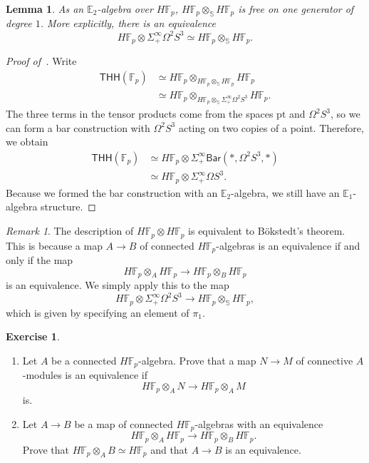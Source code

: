 \documentclass[10pt, oneside]{memoir}
\newtheorem{lem}[thm]{Lemma}
\theoremstyle{definition}
\newtheorem{exer}[thm]{Exercise}
\theoremstyle{remark}
\newtheorem{rmk}[thm]{Remark}
\theoremstyle{plain}
\theoremstyle{definition}
\theoremstyle{remark}
\newcommand{\E}{\mathbb{E}}
\newcommand{\F}{\mathbb{F}}
\newcommand{\bS}{\mathbb{S}}
\newcommand{\mr}[1]{\mathrm{#1}}
\newcommand{\ms}[1]{\mathsf{#1}}
\newcommand{\1}{\mathbf{1}}
\newcommand{\2}{\mathbf{2}}
\newcommand{\3}{\mathbf{3}}
\newcommand{\THH}{\ms{THH}}
\begin{document}
\begin{lem}\label{lem:tensorproduct}
    As an \(\E_2 \)-algebra over \(H \F_p \), \(H \F_p \otimes_{\bS} H \F_p \) is free on one generator of degree \(1 \). More explicitly, there is an equivalence
    \[ H \F_p \otimes \Sigma_+^{\infty} \Omega^2 S^3 \simeq H \F_p \otimes_{\bS} H \F_p. \]
\end{lem}

\begin{proof}[Proof of~]
    Write
    \begin{align*}
        \THH(\F_p) &\simeq H \F_p \otimes_{H \F_p \otimes_{\bS} H \F_p} H \F_p \\
        &\simeq H \F_p \otimes_{H \F_p \otimes_{\bS} \Sigma_+^{\infty}\Omega^2 S^3} H \F_p.
    \end{align*}
    The three terms in the tensor products come from the spaces \(\mr{pt} \) and \(\Omega^2 S^3 \), so we can form a bar construction with \(\Omega^2 S^3 \) acting on two copies of a point. Therefore, we obtain
    \begin{align*}
        \THH(\F_p) &\simeq H \F_p \otimes \Sigma_+^{\infty} \ms{Bar}(*, \Omega^2 S^3, *) \\
        &\simeq H \F_p \otimes \Sigma_+^{\infty} \Omega S^3.
    \end{align*}
    Because we formed the bar construction with an \(\E_2 \)-algebra, we still have an \(\E_1 \)-algebra structure.
\end{proof}

\begin{rmk}
    The description of \(H \F_p \otimes H \F_p \) is equivalent to B\"okstedt's theorem. This is because a map \(A \to B \) of connected \(H \F_p \)-algebras is an equivalence if and only if the map
    \[ H \F_p \otimes_A H \F_p \to H \F_p \otimes_B H \F_p \]
    is an equivalence. We simply apply this to the map
    \[ H \F_p \otimes \Sigma_+^{\infty} \Omega^2 S^3 \to H \F_p \otimes_{\bS} H \F_p, \]
    which is given by specifying an element of \(\pi_1 \).
\end{rmk}

\begin{exer}\leavevmode
    \begin{enumerate}
        \item Let \(A \) be a connected \(H \F_p \)-algebra. Prove that a map \(N \to M \) of connective \(A \)-modules is an equivalence if
        \[ H \F_p \otimes_A N \to H \F_p \otimes_A M \]
        is.
        \item Let \(A \to B \) be a map of connected \(H \F_p \)-algebras with an equivalence
        \[ H \F_p \otimes_A H \F_p \to H \F_p \otimes_B H \F_p. \]
        Prove that \(H \F_p \otimes_A B \simeq H \F_p \) and that \(A \to B \) is an equivalence.
    \end{enumerate}
\end{exer}
\end{document}
